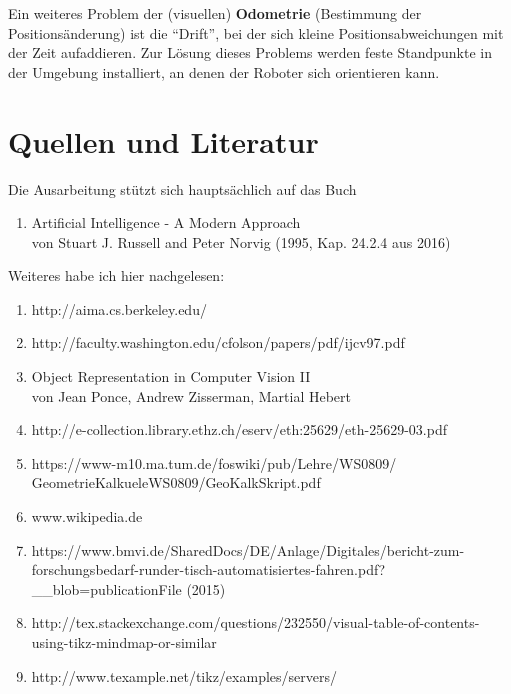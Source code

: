 Ein weiteres Problem der (visuellen) \textbf{Odometrie} (Bestimmung der Positionsänderung) ist die "`Drift"', bei der sich kleine Positionsabweichungen mit der Zeit aufaddieren. Zur Lösung dieses Problems werden feste Standpunkte in der Umgebung installiert, an denen der Roboter sich orientieren kann.

\section{Quellen und Literatur}
Die Ausarbeitung stützt sich hauptsächlich auf das Buch
\begin{enumerate}
\item []
Artificial Intelligence - A Modern Approach \\
von Stuart J. Russell and Peter Norvig (1995, Kap. 24.2.4 aus 2016)
\end{enumerate}
Weiteres habe ich hier nachgelesen:
\begin{enumerate}
\item [] http://aima.cs.berkeley.edu/
\item [] http://faculty.washington.edu/cfolson/papers/pdf/ijcv97.pdf
\item [] Object Representation in Computer Vision II\\ von Jean Ponce, Andrew Zisserman, Martial Hebert
\item [] http://e-collection.library.ethz.ch/eserv/eth:25629/eth-25629-03.pdf
\item [] https://www-m10.ma.tum.de/foswiki/pub/Lehre/WS0809/\\GeometrieKalkueleWS0809/GeoKalkSkript.pdf
\item [] www.wikipedia.de
\item [] https://www.bmvi.de/SharedDocs/DE/Anlage/Digitales/bericht-zum-forschungsbedarf-runder-tisch-automatisiertes-fahren.pdf?\_\_blob=publicationFile (2015)
\item [] http://tex.stackexchange.com/questions/232550/visual-table-of-contents-using-tikz-mindmap-or-similar
\item [] http://www.texample.net/tikz/examples/servers/
\end{enumerate}
